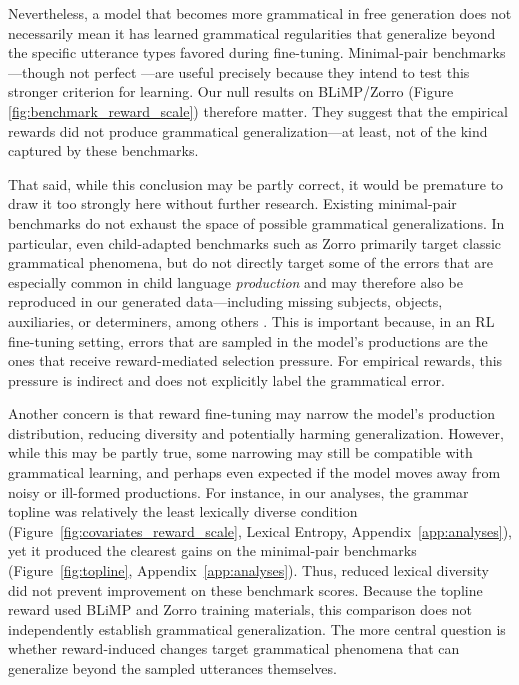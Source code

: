 Nevertheless, a model that becomes more grammatical in free generation does not necessarily mean it has learned grammatical regularities that generalize beyond the specific utterance types favored during fine-tuning.
Minimal-pair benchmarks---though not perfect \cite{martinez2023evaluating}---are useful precisely because they intend to test this stronger criterion for learning. Our null results on BLiMP/Zorro (Figure \ref{fig:benchmark_reward_scale}) therefore matter. They suggest that the empirical rewards did not produce grammatical generalization---at least, not of the kind captured by these benchmarks.

That said, while this conclusion may be partly correct, it would be premature to draw it too strongly here without further research. Existing minimal-pair benchmarks do not exhaust the space of possible grammatical generalizations. In particular, even child-adapted benchmarks such as Zorro primarily target classic grammatical phenomena, but do not directly target some of the errors that are especially common in child language \textit{production} and may therefore also be reproduced in our generated data---including missing subjects, objects, auxiliaries, or determiners, among others \cite{saxton2005prompt, hiller_data-driven_2016, nikolaus_automatic_2024}. This is important because, in an RL fine-tuning setting,  errors that are sampled in the model's productions are the ones that receive reward-mediated selection pressure. For empirical rewards, this pressure is indirect and does not explicitly label the grammatical error.

Another concern is that reward fine-tuning may narrow the model’s production distribution, reducing diversity and potentially harming generalization. However, while this may be partly true, some narrowing may still be compatible with grammatical learning, and perhaps even expected if the model moves away from noisy or ill-formed productions. For instance, in our analyses, the grammar topline was relatively the least lexically diverse condition (Figure~\ref{fig:covariates_reward_scale}, Lexical Entropy, Appendix~\ref{app:analyses}), yet it produced the clearest gains on the minimal-pair benchmarks (Figure~\ref{fig:topline}, Appendix~\ref{app:analyses}). Thus, reduced lexical diversity did not prevent improvement on these benchmark scores. Because the topline reward used BLiMP and Zorro training materials, this comparison does not independently establish grammatical generalization. The more central question is whether reward-induced changes target grammatical phenomena that can generalize beyond the sampled utterances themselves.

